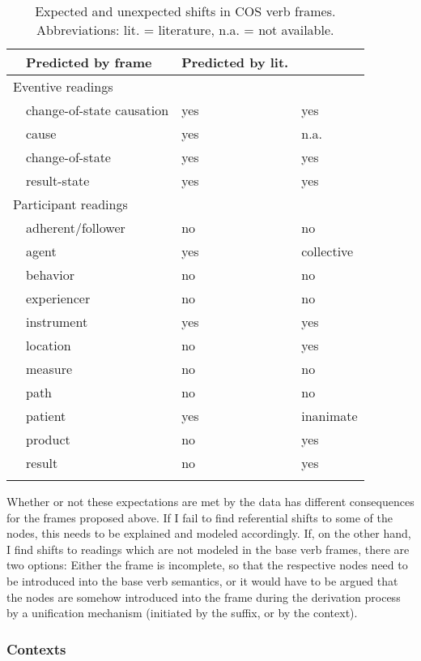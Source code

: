 \begin{table}
  \caption[Expected and unexpected shifts in COS verb frames]{Expected and unexpected shifts in COS verb frames. Abbreviations: lit. = literature, n.a. = not available.} 
  \label{tab:predictions}
  \begin{tabular}{llll}
    \lsptoprule
    \multicolumn{2}{l}{Reading} & Predicted by frame & Predicted by lit. \\
    \midrule
    \multicolumn{2}{l}{Eventive readings} &&\\
    &change-of-state causation&yes&yes\\
    &cause&yes&n.a.\\
    &change-of-state&yes&yes\\
    &result-state&yes&yes\\
    \multicolumn{2}{l}{Participant readings}&&\\
    &adherent/follower&no&no\\
    &agent&yes&collective\\
    &behavior&no&no\\
    &experiencer&no&no\\
    &instrument&yes&yes\\
    &location&no&yes\\
    &measure&no&no\\
    &path&no&no\\
    &patient&yes&inanimate\\
    &product&no&yes\\
    &result&no&yes\\
    \lspbottomrule
  \end{tabular}
\end{table} 

Whether or not these expectations are met by the data has different consequences for the frames proposed above. 
If I fail to find referential shifts to some of the nodes, this needs to be explained and modeled accordingly. 
If, on the other hand, I find shifts to readings which are not modeled in the base verb frames, there are two options: Either the frame is incomplete, so that the respective nodes need to be introduced into the base verb semantics, or it would have to be argued that the nodes are somehow introduced into the frame during the derivation process by a unification mechanism (initiated by the suffix, or by the context). 

\subsubsection{Contexts}\label{sec:cos-output-predictions-cont}\largerpage

